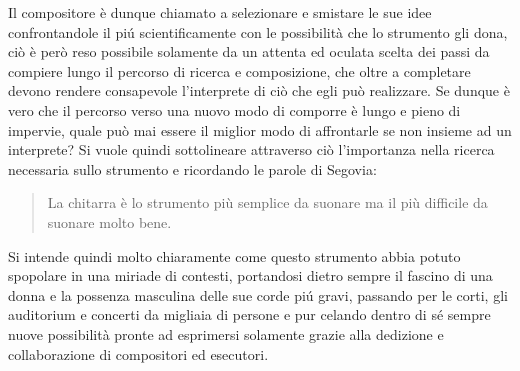 \documentclass[oneside]{article}
\begin{document}
\begin{multicols*}{2}
Il compositore è dunque chiamato a selezionare e smistare le sue idee confrontandole il piú scientificamente con le possibilità che lo strumento gli dona, ciò è però reso possibile solamente da un attenta ed oculata scelta dei passi da compiere lungo il percorso di ricerca e composizione, che oltre a completare devono rendere consapevole l'interprete di ciò che egli può realizzare. Se dunque è vero che il percorso verso una nuovo modo di comporre è lungo e pieno di impervie, quale può mai essere il miglior modo di affrontarle se non insieme ad un interprete? Si vuole quindi sottolineare attraverso ciò l'importanza nella ricerca necessaria sullo strumento e ricordando le parole di Segovia: \begin{quote} La chitarra è lo strumento più semplice da suonare ma il più difficile da suonare molto bene.\end{quote} Si intende quindi molto chiaramente come questo strumento abbia potuto spopolare in una miriade di contesti, portandosi dietro sempre il fascino di una donna e la possenza masculina delle sue corde piú gravi, passando per le corti, gli auditorium e concerti da migliaia di persone e pur celando dentro di sé sempre nuove possibilità pronte ad esprimersi solamente grazie alla dedizione e collaborazione di compositori ed esecutori. 


\newpage



\end{multicols*}
\end{document}
